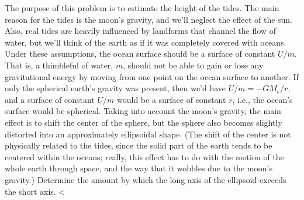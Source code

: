        The purpose of this problem is to estimate the height of the tides. The main
        reason for the tides is the moon's gravity, and we'll neglect the effect of the sun.
        Also, real tides are heavily influenced by landforms that channel the flow of
        water, but we'll think of the earth as if it was completely covered with oceans.
        Under these assumptions, the ocean surface should be a surface of constant
        $U/m$. That is, a thimbleful of water, $m$, should not be able to gain or lose
        any gravitational energy by moving from one point on the ocean surface to
        another. If only the spherical earth's gravity was present, then we'd have
        $U/m=-GM_e/r$, and a surface of constant $U/m$ would be a surface of
        constant $r$, i.e., the ocean's surface would be spherical. Taking into account
        the moon's gravity, the main effect is to shift the center of the sphere, but the
        sphere also becomes slightly distorted into an approximately ellipsoidal shape.
        (The shift of the center is not physically related to the tides, since the solid part
        of the earth tends to be centered within the oceans; really, this effect has to
        do with the motion of the whole earth through space, and the way that it
        wobbles due to the moon's gravity.) Determine the amount by which the long
        axis of the ellipsoid exceeds the short axis.
        <%
